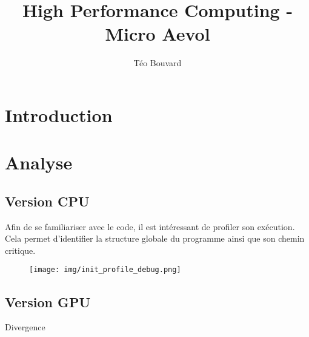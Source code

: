 \documentclass[a4paper, 10pt, twoside]{article}
\begin{document}
\title{High Performance Computing - Micro Aevol}
\author{T\'eo Bouvard}
\maketitle

\section{Introduction}
\section{Analyse}
\subsection{Version CPU}
Afin de se familiariser avec le code, il est intéressant de profiler son exécution. Cela permet d'identifier la structure globale du programme ainsi que son chemin critique.
\begin{figure}
	\texttt{[image: img/init\_profile\_debug.png]}
\end{figure}
\subsection{Version GPU}

Divergence \citep{nvidia/branching}




\end{document}
